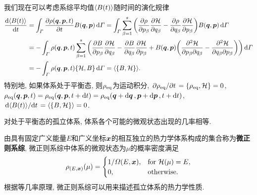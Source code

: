 我们现在可以考虑系综平均值$ \langle B(t)\rangle $随时间的演化规律
\begin{align*}
    \dv{\avg{B(t)}}{t} &= \int_{\varGamma} \pdv{\rho(\vb*{q},\vb*{p},t)}{t} B(\vb*{q},\vb*{p}) \dd{\varGamma} = \int_{\varGamma} \sum_{\beta=1}^s \bigg(\pdv{\rho}{p_{\beta}} \pdv{\hami}{q_{\beta}} - \pdv{\rho}{q_{\beta}} \pdv{\hami}{p_{\beta}} \bigg) B(\vb*{q},\vb*{p}) \dd{\varGamma}\\
    &=-\int_{\varGamma} \rho(\vb*{q},\vb*{p},t) \sum_{\beta=1}^s \bigg(\pdv{B}{p_{\beta}} \pdv{\hami}{q_{\beta}} - \pdv{B}{q_{\beta}} \pdv{\hami}{p_{\beta}} + B(\vb*{q},\vb*{p})\bigg( \pdv{\hami}{p_{\beta}}{q_{\beta}} - \pdv{\hami}{q_{\beta}}{p_{\beta}} \bigg) \bigg) \dd{\varGamma}\\
    &=-\int_{\varGamma} \rho(\vb*{q},\vb*{p},t) \pb{\hami}{B} \dd{\varGamma} = \avg{\pb{B}{\hami}}.
\end{align*}
特别地, 如果体系处于平衡态, 则$ \rho_{\mathrm{eq}} $为运动积分, $ \pdv*{\rho_{\eqv}}{t}=\pb{\rho_{\eqv}}{\hami}=0 $, $ \rho_{\mathrm{eq}}(\vb*{q},\vb*{p},t)=\rho_{\mathrm{eq}}(\vb*{q},\vb*{p},t+\dd{t})=\rho_{\mathrm{eq}}(\vb*{q}+\dd{\vb*{q}},\vb*{p}+\dd{\vb*{p}},t+\dd{t}) $, $ \dv*{\avg{B(t)}}{t}=\avg{\pb{B}{\hami}}=0 $.

\begin{postulate}[等几率原理]\label{pos:等几率原理}
    对处于平衡态的孤立体系, 体系各个可能的微观状态出现的几率相等.
\end{postulate}

由具有固定广义能量$ E $和广义坐标$ \vb*{x} $的相互独立的热力学体系构成的集合称为\textbf{微正则系综}, 微正则系综中体系的微观状态为$ \mu $的概率密度满足
\begin{equation}
    \rho_{(E,\vb*{x})}(\mu)=
    \begin{cases}
        1/\varOmega(E,\vb*{x}), & \text{for }\mathcal{H}(\mu)=E,\\
        0, & \text{otherwise}.
    \end{cases}
\end{equation}
根据等几率原理, 微正则系综可以用来描述孤立体系的热力学性质.
